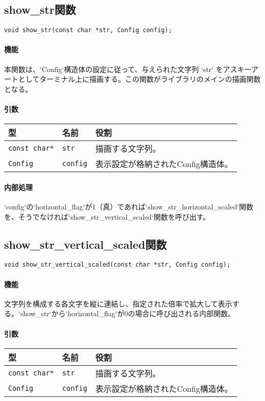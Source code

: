 \documentclass[uplatex]{jsarticle}
\begin{document}
\subsection{show\_str関数}
\texttt{void show\_str(const char *str, Config config);}
\paragraph{機能}
本関数は、`Config`構造体の設定に従って、与えられた文字列 `str` をアスキーアートとしてターミナル上に描画する。この関数がライブラリのメインの描画関数となる。

\paragraph{引数}
\begin{center}
    \begin{tabular}{|l|l|p{7.5cm}|}
        \hline
        \textbf{型} & \textbf{名前} & \textbf{役割} \\ \hline
        \texttt{const char*} & \texttt{str} & 描画する文字列。 \\ \hline
        \texttt{Config} & \texttt{config} & 表示設定が格納されたConfig構造体。 \\ \hline
    \end{tabular}
\end{center}

\paragraph{内部処理}
`config`の`horizontal\_flag`が1（真）であれば`show\_str\_horizontal\_scaled`関数を、そうでなければ`show\_str\_vertical\_scaled`関数を呼び出す。


\subsection{show\_str\_vertical\_scaled関数}
\texttt{void show\_str\_vertical\_scaled(const char *str, Config config);}
\paragraph{機能}
文字列を構成する各文字を縦に連結し、指定された倍率で拡大して表示する。`show\_str`から`horizontal\_flag`が0の場合に呼び出される内部関数。

\paragraph{引数}
\begin{center}
    \begin{tabular}{|l|l|p{7.5cm}|}
        \hline
        \textbf{型} & \textbf{名前} & \textbf{役割} \\ \hline
        \texttt{const char*} & \texttt{str} & 描画する文字列。 \\ \hline
        \texttt{Config} & \texttt{config} & 表示設定が格納されたConfig構造体。 \\ \hline
    \end{tabular}
\end{center}
\end{document}
